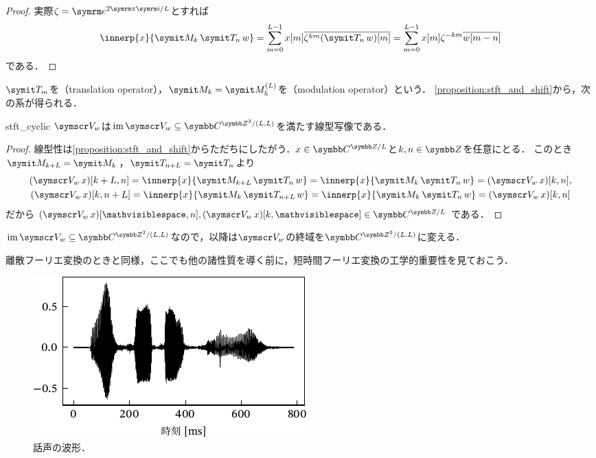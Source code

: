 \documentclass[../../main]{subfiles}
\begin{document}
\begin{proof}
  実際\(\zeta=\napr^{2\krez\iuni/L}\)とすれば
  \[
    \innerp{x}{\modulate{k}\translate{n}w} = \sum_{m=0}^{L-1}x[m]\conj*{\zeta^{km}(\translate{n}w)[m]}
    = \sum_{m=0}^{L-1}x[m]\zeta^{-km}\conj*{w[m-n]}
  \]
  である．
\end{proof}

\(\translate{m}\)を（translation operator），\(\modulate{k}=\modulate[L]{k}\)を（modulation operator）という．
\cref{proposition:stft_and_shift}から，次の系が得られる．

\begin{corollary}{}{stft_cyclic}
  \(\stft{w}\)は\(\img\stft{w}\subseteq\cycles[2]{\numset{C}}{L,L}\)を満たす線型写像である．
\end{corollary}

\begin{proof}
  線型性は\cref{proposition:stft_and_shift}からただちにしたがう．\(x\in\cycles{\numset{C}}{L}\)と\(k,n\in\numset{Z}\)を任意にとる．
  このとき\(\modulate{k+L}=\modulate{k}\)，\(\translate{n+L}=\translate{n}\)より
  \begin{gather*}
    (\stft{w}x)[k+L,n] = \innerp{x}{\modulate{k+L}\translate{n}w}
    = \innerp{x}{\modulate{k}\translate{n}w}
    = (\stft{w}x)[k,n], \\
    (\stft{w}x)[k,n+L] = \innerp{x}{\modulate{k}\translate{n+L}w}
    = \innerp{x}{\modulate{k}\translate{n}w}
    = (\stft{w}x)[k,n]
  \end{gather*}
  だから\((\stft{w}x)[\holder,n],(\stft{w}x)[k,\holder]\in\cycles{\numset{C}}{L}\)である．
\end{proof}

\(\img\stft{w}\subseteq\cycles[2]{\numset{C}}{L,L}\)なので，\alert{以降は\(\stft{w}\)の終域を\(\cycles[2]{\numset{C}}{L,L}\)に変える}．

離散フーリエ変換のときと同様，ここでも他の諸性質を導く前に，短時間フーリエ変換の工学的重要性を見ておこう．

\begin{figure}[htbp]
  \centering
  \includegraphics{figures/phone.pdf}
  \caption{話声の波形．}
  \label{figure:phone}
\end{figure}
\end{document}
